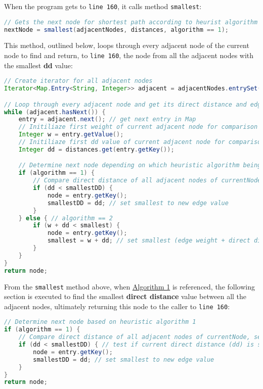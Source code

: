 When the program gets to \texttt{line 160}, it calls method \texttt{smallest}:
\begin{lstlisting}[language=Java]
// Gets the next node for shortest path according to heurist algorithm == 1
nextNode = smallest(adjacentNodes, distances, algorithm == 1);
\end{lstlisting}

This method, outlined below, loops through every adjacent node of the current node to find and return, to \texttt{line 160}, the node from all the adjacent nodes with the smallest \textbf{dd} value:
\begin{lstlisting}[language=Java]
// Create iterator for all adjacent nodes
Iterator<Map.Entry<String, Integer>> adjacent = adjacentNodes.entrySet().iterator();

// Loop through every adjacent node and get its direct distance and edge value
while (adjacent.hasNext()) {
    entry = adjacent.next(); // get next entry in Map
    // Initiliaze first weight of current adjacent node for comparison
    Integer w = entry.getValue();
    // Initiliaze first dd value of current adjacent node for comparison
    Integer dd = distances.get(entry.getKey());

    // Determine next node depending on which heuristic algorithm being used
    if (algorithm == 1) {
        // Compare direct distance of all adjacent nodes of currentNode, set smallest direct distance node
        if (dd < smallestDD) {
            node = entry.getKey();
            smallestDD = dd; // set smallest to new edge value
        }
    } else { // algorithm == 2
        if (w + dd < smallest) {
            node = entry.getKey();
            smallest = w + dd; // set smallest (edge weight + direct distance)
        }
    }
}
return node;
\end{lstlisting}

From the \texttt{smallest} method above, when \hyperref[algo1]{Algorithm 1} is referenced, the following section is executed to find the smallest \textbf{direct distance} value between all the adjacent nodes, ultimately returning this node to the caller to \texttt{line 160}:
\begin{lstlisting}[language=Java]
// Determine next node based on heuristic algorithm 1
if (algorithm == 1) {
    // Compare direct distance of all adjacent nodes of currentNode, set smallest direct distance node
    if (dd < smallestDD) { // test if current direct distance (dd) is smaller than previous
        node = entry.getKey();
        smallestDD = dd; // set smallest to new edge value
    }
}
return node;
\end{lstlisting}

